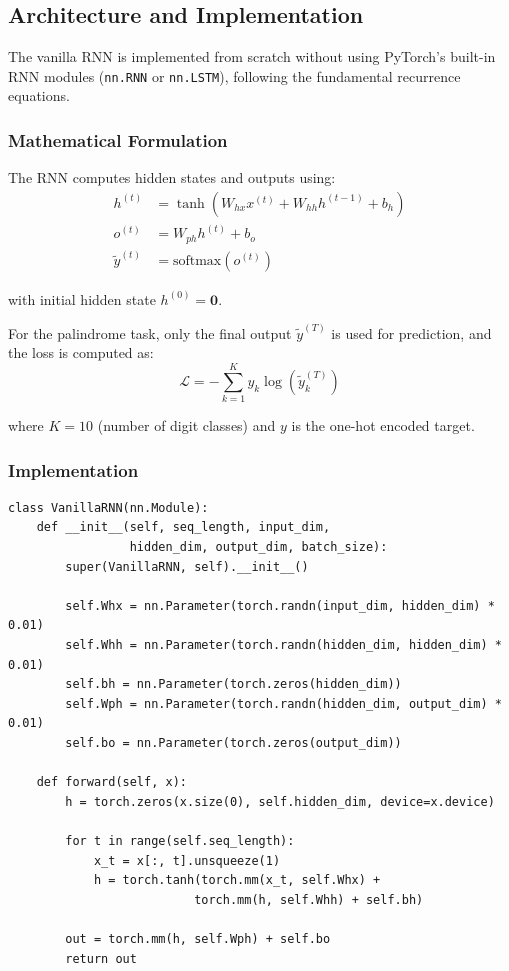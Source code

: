 \documentclass[11pt,a4paper]{article}
\begin{document}
\subsection{Architecture and Implementation}

The vanilla RNN is implemented from scratch without using PyTorch's built-in RNN modules (\texttt{nn.RNN} or \texttt{nn.LSTM}), following the fundamental recurrence equations.

\subsubsection{Mathematical Formulation}

The RNN computes hidden states and outputs using:
\begin{align}
    h^{(t)} &= \tanh(W_{hx} x^{(t)} + W_{hh} h^{(t-1)} + b_h) \label{eq:rnn_hidden}\\
    o^{(t)} &= W_{ph} h^{(t)} + b_o \label{eq:rnn_output}\\
    \tilde{y}^{(t)} &= \text{softmax}(o^{(t)}) \label{eq:rnn_softmax}
\end{align}

with initial hidden state $h^{(0)} = \mathbf{0}$.

For the palindrome task, only the final output $\tilde{y}^{(T)}$ is used for prediction, and the loss is computed as:
\begin{equation}
    \mathcal{L} = -\sum_{k=1}^{K} y_k \log(\tilde{y}_k^{(T)})
\end{equation}

where $K=10$ (number of digit classes) and $y$ is the one-hot encoded target.

\subsubsection{Implementation}

\begin{lstlisting}[caption={Vanilla RNN Implementation}]
class VanillaRNN(nn.Module):
    def __init__(self, seq_length, input_dim, 
                 hidden_dim, output_dim, batch_size):
        super(VanillaRNN, self).__init__()
        
        self.Whx = nn.Parameter(torch.randn(input_dim, hidden_dim) * 0.01)
        self.Whh = nn.Parameter(torch.randn(hidden_dim, hidden_dim) * 0.01)
        self.bh = nn.Parameter(torch.zeros(hidden_dim))
        self.Wph = nn.Parameter(torch.randn(hidden_dim, output_dim) * 0.01)
        self.bo = nn.Parameter(torch.zeros(output_dim))
    
    def forward(self, x):
        h = torch.zeros(x.size(0), self.hidden_dim, device=x.device)
        
        for t in range(self.seq_length):
            x_t = x[:, t].unsqueeze(1)
            h = torch.tanh(torch.mm(x_t, self.Whx) + 
                          torch.mm(h, self.Whh) + self.bh)
        
        out = torch.mm(h, self.Wph) + self.bo
        return out
\end{lstlisting}
\end{document}
